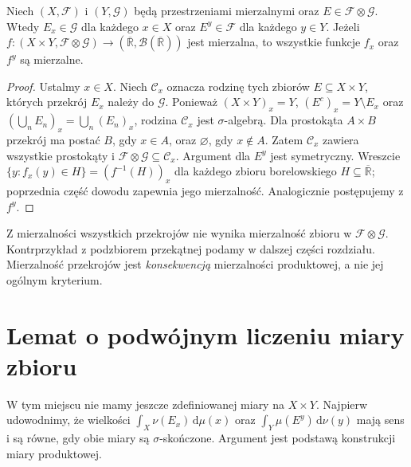 \begin{lemat}
\label{lem:sections-measurable-12}
Niech $(X,\mathcal F)$ i $(Y,\mathcal G)$ będą
przestrzeniami mierzalnymi oraz
$E\in\mathcal F\otimes\mathcal G$.
Wtedy $E_x\in\mathcal G$ dla każdego $x\in X$
oraz $E^y\in\mathcal F$ dla każdego $y\in Y$.
Jeżeli $f:(X\times Y,\mathcal F\otimes\mathcal G)
\to(\overline{\mathbb R},\mathcal B(\overline{\mathbb R}))$
jest mierzalna, to wszystkie funkcje $f_x$ oraz $f^y$
są mierzalne.
\end{lemat}
\begin{proof}
Ustalmy $x\in X$. Niech $\mathcal C_x$ oznacza rodzinę
tych zbiorów $E\subseteq X\times Y$, których przekrój
$E_x$ należy do $\mathcal G$. Ponieważ
$(X\times Y)_x=Y$, $(E^c)_x=Y\setminus E_x$ oraz
$(\bigcup_nE_n)_x=\bigcup_n(E_n)_x$, rodzina
$\mathcal C_x$ jest $\sigma$-algebrą. Dla prostokąta
$A\times B$ przekrój ma postać $B$, gdy $x\in A$,
oraz $\varnothing$, gdy $x\notin A$. Zatem
$\mathcal C_x$ zawiera wszystkie prostokąty i
$\mathcal F\otimes\mathcal G\subseteq\mathcal C_x$.
Argument dla $E^y$ jest symetryczny. Wreszcie
$\{y:f_x(y)\in H\}=(f^{-1}(H))_x$ dla każdego
zbioru borelowskiego $H\subseteq\overline{\mathbb R}$;
poprzednia część dowodu zapewnia jego mierzalność.
Analogicznie postępujemy z $f^y$.
\end{proof}

\begin{uwaga}
Z mierzalności wszystkich przekrojów nie wynika
mierzalność zbioru w $\mathcal F\otimes\mathcal G$.
Kontrprzykład z podzbiorem przekątnej podamy w dalszej
części rozdziału. Mierzalność przekrojów jest
\emph{konsekwencją} mierzalności produktowej, a nie
jej ogólnym kryterium.
\end{uwaga}

\section{Lemat o podwójnym liczeniu miary zbioru}

W tym miejscu nie mamy jeszcze zdefiniowanej miary na
$X\times Y$. Najpierw udowodnimy, że wielkości
$\int_X\nu(E_x)\,\mathrm d\mu(x)$ oraz
$\int_Y\mu(E^y)\,\mathrm d\nu(y)$ mają sens
i są równe, gdy obie miary są $\sigma$-skończone.
Argument jest podstawą konstrukcji miary produktowej.

